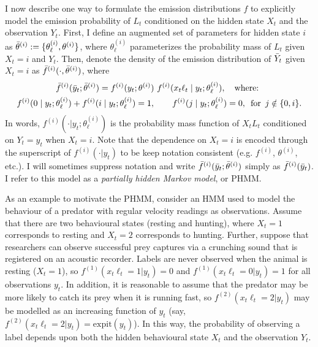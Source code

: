 I now describe one way to formulate the emission distributions $f$ to explicitly model the emission probability of $L_t$ conditioned on the hidden state $X_t$ and the observation $Y_t$. First, I define an augmented set of parameters for hidden state $i$ as $\bar{\theta}^{(i)} := \{\theta^{(i)}_{\ell},\theta^{(i)}\}$, where $\theta^{(i)}_{\ell}$ parameterizes the probability mass of $L_t$ given $X_t = i$ and $Y_t$.  Then, denote the density of the emission distribution of $\bar{Y}_t$ given $X_t = i$ as $\bar{f}^{(i)}(\cdot,\bar{\theta}^{(i)})$, where
%
\begin{gather}
    \bar{f}^{(i)}(\bar{y}_t;\bar{\theta}^{(i)}) = f^{(i)}(y_t;\theta^{(i)}) ~ f^{(i)}(x_t\ell_t \mid y_t;\theta^{(i)}_{\ell})
    \label{eqn:PHMM_emis}, \quad \text{where: } \\
    f^{(i)}(0 \mid y_t;\theta^{(i)}_{\ell}) + f^{(i)}(i \mid y_t;\theta^{(i)}_{\ell}) = 1, \qquad f^{(i)}(j \mid y_t;\theta^{(i)}_{\ell}) = 0, \enspace \text{for} \enspace j \notin \{0,i\}. \nonumber
\end{gather}
%
In words, $f^{(i)}(\cdot|y_t;\theta^{(i)}_{\ell})$ is the probability mass function of $X_t L_t$ conditioned on $Y_t = y_t$ when $X_t = i$. Note that the dependence on $X_t = i$ is encoded through the superscript of $f^{(i)}(\cdot|y_t)$ to be keep notation consistent (e.g. $f^{(i)}$, $\theta^{(i)}$, etc.). I will sometimes suppress notation and write $\bar{f}^{(i)}(\bar{y}_t;\bar{\theta}^{(i)})$ simply as $\bar{f}^{(i)}(\bar{y}_t)$. %
I refer to this model as a \textit{partially hidden Markov model}, or PHMM. 

As an example to  motivate the PHMM, consider an HMM used to model the behaviour of a predator with regular velocity readings as observations. Assume that there are two behavioural states (resting and hunting), where $X_t = 1$ corresponds to resting and $X_t = 2$ corresponds to hunting. Further, suppose that researchers can observe successful prey captures via a crunching sound that is registered on an acoustic recorder. Labels are never observed when the animal is resting ($X_t = 1$), so $f^{(1)}(x_t\ell_t = 1|y_t) = 0$ and $f^{(1)}(x_t\ell_t = 0|y_t) = 1$ for all observations $y_t$. 
In addition, it is reasonable to assume that the predator may be more likely to catch its prey when it is running fast, so $f^{(2)}(x_t\ell_t = 2|y_t)$ may be modelled as an increasing function of $y_t$ (say, $f^{(2)}(x_t\ell_t = 2|y_t) = \text{expit}(y_t)$). In this way, the probability of observing a label depends upon both the hidden behavioural state $X_t$ and the observation $Y_t$.


